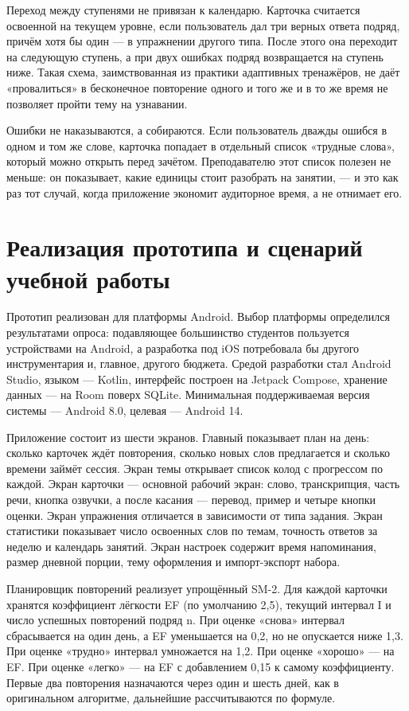 \documentclass[11pt,a4paper,openany]{report}
\begin{document}
Переход между ступенями не привязан к календарю. Карточка считается освоенной на текущем уровне, если пользователь дал три верных ответа подряд, причём хотя бы один — в упражнении другого типа. После этого она переходит на следующую ступень, а при двух ошибках подряд возвращается на ступень ниже. Такая схема, заимствованная из практики адаптивных тренажёров, не даёт «провалиться» в бесконечное повторение одного и того же и в то же время не позволяет пройти тему на узнавании.

Ошибки не наказываются, а собираются. Если пользователь дважды ошибся в одном и том же слове, карточка попадает в отдельный список «трудные слова», который можно открыть перед зачётом. Преподавателю этот список полезен не меньше: он показывает, какие единицы стоит разобрать на занятии, — и это как раз тот случай, когда приложение экономит аудиторное время, а не отнимает его.

\section{Реализация прототипа и сценарий учебной работы}

Прототип реализован для платформы Android. Выбор платформы определился результатами опроса: подавляющее большинство студентов пользуется устройствами на Android, а разработка под iOS потребовала бы другого инструментария и, главное, другого бюджета. Средой разработки стал Android Studio, языком — Kotlin, интерфейс построен на Jetpack Compose, хранение данных — на Room поверх SQLite. Минимальная поддерживаемая версия системы — Android 8.0, целевая — Android 14.

Приложение состоит из шести экранов. Главный показывает план на день: сколько карточек ждёт повторения, сколько новых слов предлагается и сколько времени займёт сессия. Экран темы открывает список колод с прогрессом по каждой. Экран карточки — основной рабочий экран: слово, транскрипция, часть речи, кнопка озвучки, а после касания — перевод, пример и четыре кнопки оценки. Экран упражнения отличается в зависимости от типа задания. Экран статистики показывает число освоенных слов по темам, точность ответов за неделю и календарь занятий. Экран настроек содержит время напоминания, размер дневной порции, тему оформления и импорт-экспорт набора.

Планировщик повторений реализует упрощённый SM-2. Для каждой карточки хранятся коэффициент лёгкости EF (по умолчанию 2,5), текущий интервал I и число успешных повторений подряд n. При оценке «снова» интервал сбрасывается на один день, а EF уменьшается на 0,2, но не опускается ниже 1,3. При оценке «трудно» интервал умножается на 1,2. При оценке «хорошо» — на EF. При оценке «легко» — на EF с добавлением 0,15 к самому коэффициенту. Первые два повторения назначаются через один и шесть дней, как в оригинальном алгоритме, дальнейшие рассчитываются по формуле.
\end{document}
